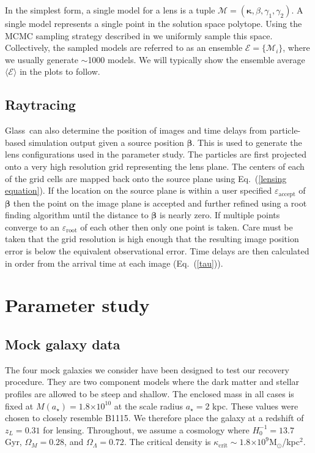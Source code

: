 \documentclass[onecolumn,galley]{mn2e}
\newcommand{\Glass}{{\sc Glass}}
\newcommand{\M}{\ensuremath{\mathscr{M}}}
\newcommand{\E}{\ensuremath{\mathscr{E}}}
\newcommand{\eps}{\ensuremath{\varepsilon}}
\newcommand{\Eavg}{\ensuremath{\langle \E \rangle}}
\newcommand{\Msun}{\ensuremath{\mathrm{M}_\odot}}
\newcommand{\eqnref}[1] {Eq.~(\ref{#1})}
\newcommand{\e}[1]{\ensuremath{\times 10^{#1}}}
\renewcommand{\vec}[1]{\ensuremath{\boldsymbol{#1}}}
\begin{document}
In the simplest form, a single model for a lens is a tuple $\M = (\vec\kappa,
\beta, \gamma_1, \gamma_2)$. A single model represents a single point in the
solution space polytope. Using the MCMC sampling strategy described in \cite{}
we uniformly sample this space. Collectively, the sampled models are referred
to as an ensemble $\E = \{\M_i\}$, where we usually generate $\sim$1000 models. We
will typically show the ensemble average $\Eavg$ in the plots to
follow.



\subsection{Raytracing}
\label{Raytracing}
\Glass\ can also determine the position of images and time delays from 
particle-based simulation output given a source position $\vec\beta$. This is
used to generate the lens configurations used in the parameter study.  The
particles are first projected onto a very high resolution grid representing the
lens plane. The centers of each of the grid cells are mapped back onto the
source plane using \eqnref{lensing equation}. If the location on the source
plane is within a user specified $\eps_\mathrm{accept}$ of $\vec\beta$ then the
point on the image plane is accepted and further refined using a root finding
algorithm until the distance to $\vec\beta$ is nearly zero. If multiple points
converge to an $\eps_\mathrm{root}$ of each other then only one point is taken.
Care must be taken that the grid resolution is high enough that the resulting
image position error is below the equivalent observational error. Time delays
are then calculated in order from the arrival time at each image (\eqnref{tau}).

\section{Parameter study}

\subsection{Mock galaxy data}

The four mock galaxies we consider have been designed to test our recovery
procedure. They are two component models where the dark matter and stellar
profiles are allowed to be steep and shallow.  The enclosed mass in all cases
is fixed at $M(a_\star)= 1.8\e{10}$ at the scale radius $a_\star=2$ kpc. These
values were chosen to closely resemble B1115. We therefore place the galaxy at
a redshift of $z_L = 0.31$ for lensing.  Throughout, we assume a cosmology
where $H_0^{-1}=13.7$ Gyr, $\Omega_M=0.28$, and $\Omega_\Lambda=0.72$. The
critical density is $\kappa_\mathrm{crit}\sim 1.8\e{9}$\Msun/kpc$^2$.
\end{document}
